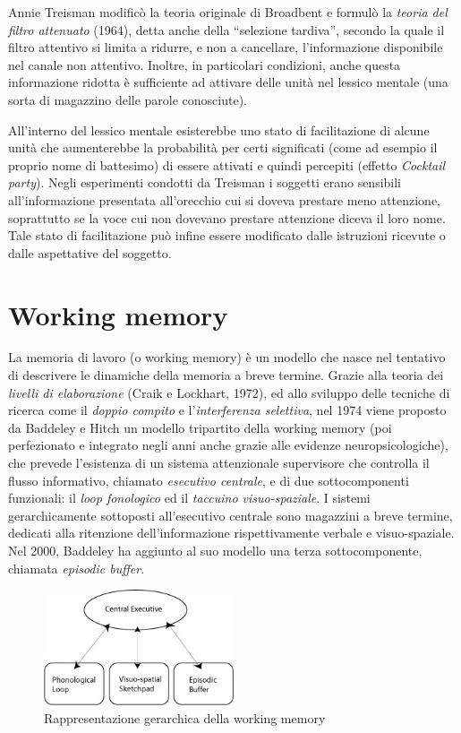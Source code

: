 Annie Treisman modificò la teoria originale di Broadbent e formulò la \emph{teoria del filtro attenuato} (1964), detta anche della ``selezione tardiva'', secondo la quale il filtro attentivo si limita a ridurre, e non a cancellare, l’informazione disponibile nel canale non attentivo. Inoltre, in particolari condizioni, anche questa informazione ridotta è sufficiente ad attivare delle unità nel lessico mentale (una sorta di magazzino delle parole conosciute).

All’interno del lessico mentale esisterebbe uno stato di facilitazione di alcune unità che aumenterebbe la probabilità per certi significati (come ad esempio il proprio nome di battesimo) di essere attivati e quindi percepiti (effetto \emph{Cocktail party}). Negli esperimenti condotti da Treisman i soggetti erano sensibili all'informazione presentata all'orecchio cui si doveva prestare meno attenzione, soprattutto se la voce cui non dovevano prestare attenzione diceva il loro nome. Tale stato di facilitazione può infine essere modificato dalle istruzioni ricevute o dalle aspettative del soggetto.

\section{Working memory}
La memoria di lavoro (o working memory) è un modello che nasce nel tentativo di descrivere le dinamiche della memoria a breve termine. Grazie alla teoria dei \emph{livelli di elaborazione} (Craik e Lockhart, 1972), ed allo sviluppo delle tecniche di ricerca come il \emph{doppio compito} e l'\emph{interferenza selettiva}, nel 1974 viene proposto da Baddeley e Hitch un modello tripartito della working memory (poi perfezionato e integrato negli anni anche grazie alle evidenze neuropsicologiche), che prevede l'esistenza di un sistema attenzionale supervisore che controlla il flusso informativo, chiamato \emph{esecutivo centrale}, e di due sottocomponenti funzionali: il \emph{loop fonologico} ed il \emph{taccuino visuo-spaziale}. I sistemi gerarchicamente sottoposti all'esecutivo centrale sono magazzini a breve termine, dedicati alla ritenzione dell'informazione rispettivamente verbale e visuo-spaziale. Nel 2000, Baddeley ha aggiunto al suo modello una terza sottocomponente, chiamata \emph{episodic buffer}.

\begin{figure}[hbt]
  \centering
  \includegraphics[width=0.5\textwidth]{img/working-memory.jpg}
  \caption{Rappresentazione gerarchica della working memory}
  \label{fig:working-memory}
\end{figure}

